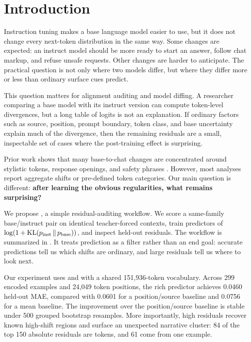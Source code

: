 \section{Introduction}
\label{sec:introduction}

Instruction tuning makes a base language model easier to use, but it does not change every next-token distribution in the same way. Some changes are expected: an instruct model should be more ready to start an answer, follow chat markup, and refuse unsafe requests. Other changes are harder to anticipate. The practical question is not only where two models differ, but where they differ more or less than ordinary surface cues predict.

This question matters for alignment auditing and model diffing. A researcher comparing a base model with its instruct version can compute token-level divergences, but a long table of logits is not an explanation. If ordinary factors such as source, position, prompt boundary, token class, and base uncertainty explain much of the divergence, then the remaining residuals are a small, inspectable set of cases where the post-training effect is surprising.

Prior work shows that many base-to-chat changes are concentrated around stylistic tokens, response openings, and safety phrases \citep{lin2023unlocking,ghosh2024limitations,qi2024safety}. However, most analyses report aggregate shifts or pre-defined token categories. Our main question is different: {\bf after learning the obvious regularities, what remains surprising?}

We propose \methodname, a simple residual-auditing workflow. We score a same-family base/instruct pair on identical teacher-forced contexts, train predictors of $\log(1+\mathrm{KL}\!\left(p_{\mathrm{inst}}\,\Vert\,p_{\mathrm{base}}\right))$, and inspect held-out residuals. The workflow is summarized in . It treats prediction as a filter rather than an end goal: accurate predictions tell us which shifts are ordinary, and large residuals tell us where to look next.

Our experiment uses \qwenbase and \qweninstruct with a shared 151,936-token vocabulary. Across 299 encoded examples and 24,049 token positions, the rich predictor achieves 0.0460 held-out MAE, compared with 0.0601 for a position/source baseline and 0.0756 for a mean baseline. The improvement over the position/source baseline is stable under 500 grouped bootstrap resamples. More importantly, high residuals recover known high-shift regions and surface an unexpected \wikitext narrative cluster: 84 of the top 150 absolute residuals are \wikitext tokens, and 61 come from one example.

